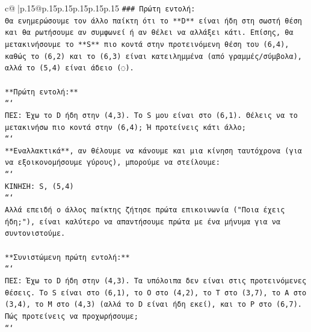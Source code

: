 \documentclass{article}
\begin{document}
{\begin{supertabular}{c@{$\;$}|p{.15\linewidth}@{}p{.15\linewidth}p{.15\linewidth}p{.15\linewidth}p{.15\linewidth}p{.15\linewidth}}
{{{\texttt{\#\#\# Πρώτη εντολή:} \\
\texttt{Θα ενημερώσουμε τον άλλο παίκτη ότι το **D** είναι ήδη στη σωστή θέση και θα ρωτήσουμε αν συμφωνεί ή αν θέλει να αλλάξει κάτι. Επίσης, θα μετακινήσουμε το **S** πιο κοντά στην προτεινόμενη θέση του (6,4), καθώς το (6,2) και το (6,3) είναι κατειλημμένα (από γραμμές/σύμβολα), αλλά το (5,4) είναι άδειο (◌).} \\
\\ 
\texttt{**Πρώτη εντολή:**} \\
\texttt{```} \\
\texttt{ΠΕΣ: Έχω το D ήδη στην (4,3). Το S μου είναι στο (6,1). Θέλεις να το μετακινήσω πιο κοντά στην (6,4); Ή προτείνεις κάτι άλλο;} \\
\texttt{```} \\
\texttt{**Εναλλακτικά**, αν θέλουμε να κάνουμε και μια κίνηση ταυτόχρονα (για να εξοικονομήσουμε γύρους), μπορούμε να στείλουμε:} \\
\texttt{```} \\
\texttt{ΚΙΝΗΣΗ: S, (5,4)} \\
\texttt{```} \\
\texttt{Αλλά επειδή ο άλλος παίκτης ζήτησε πρώτα επικοινωνία ("Ποια έχεις ήδη;"), είναι καλύτερο να απαντήσουμε πρώτα με ένα μήνυμα για να συντονιστούμε.} \\
\\ 
\texttt{**Συνιστώμενη πρώτη εντολή:**} \\
\texttt{```} \\
\texttt{ΠΕΣ: Έχω το D ήδη στην (4,3). Τα υπόλοιπα δεν είναι στις προτεινόμενες θέσεις. Το S είναι στο (6,1), το O στο (4,2), το T στο (3,7), το A στο (3,4), το M στο (4,3) (αλλά το D είναι ήδη εκεί), και το P στο (6,7). Πώς προτείνεις να προχωρήσουμε;} \\
\texttt{```} \\
            }
        }
    }
     \\ \\


\end{supertabular}}
\end{document}
